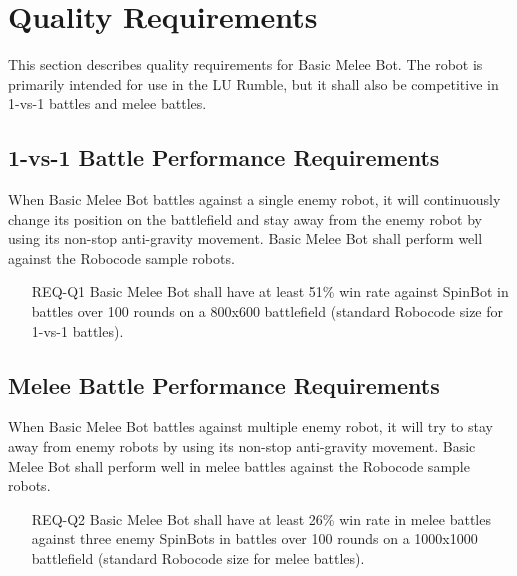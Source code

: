 \documentclass{scrreprt}
\begin{document}
\section{Quality Requirements}
This section describes quality requirements for Basic Melee Bot. The robot is primarily intended for use in the LU Rumble, but it shall also be competitive in 1-vs-1 battles and melee battles.

\subsection{1-vs-1 Battle Performance Requirements}
When Basic Melee Bot battles against a single enemy robot, it will continuously change its position on the battlefield and stay away from the enemy robot by using its non-stop anti-gravity movement. Basic Melee Bot shall perform well against the Robocode sample robots.

\begin{itemize}
\item[REQ-Q1] Basic Melee Bot shall have at least 51\% win rate against SpinBot in battles over 100 rounds on a 800x600 battlefield (standard Robocode size for 1-vs-1 battles).
\end{itemize}

\subsection{Melee Battle Performance Requirements}
When Basic Melee Bot battles against multiple enemy robot, it will try to stay away from enemy robots by using its non-stop anti-gravity movement. Basic Melee Bot shall perform well in melee battles against the Robocode sample robots.

\begin{itemize}
\item[REQ-Q2] Basic Melee Bot shall have at least 26\% win rate in melee battles against three enemy SpinBots in battles over 100 rounds on a 1000x1000 battlefield (standard Robocode size for melee battles).
\end{itemize}

\vspace{1em}
\vspace{1em}
\end{document}
